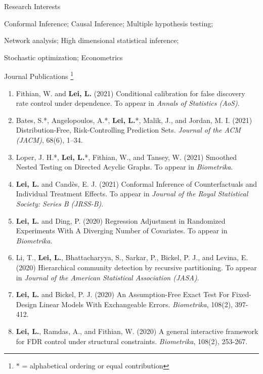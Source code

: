 \documentclass{article}
\begin{document}
\begin{large}
\noindent Research Interests
\end{large}

\vspace{3mm}
Conformal Inference; Causal Inference; Multiple hypothesis testing;

Network analysis; High dimensional statistical inference; 

Stochastic optimization; Econometrics

\vspace{3mm}

\clearpage
\begin{large}
\noindent Journal Publications \footnote{$\ast$ = alphabetical ordering or equal contribution}
\end{large}

\begin{enumerate}
\item Fithian, W. and \textbf{Lei, L.} (2021) Conditional calibration for false discovery rate control under dependence. To appear in \emph{Annals of Statistics (AoS)}.
\item Bates, S.*, Angelopoulos, A.*, \textbf{Lei, L.}*, Malik, J., and Jordan, M. I. (2021) Distribution-Free, Risk-Controlling Prediction Sets. \emph{Journal of the ACM (JACM)}, 68(6), 1–34.
\item Loper, J. H.*, \textbf{Lei, L.}*, Fithian, W., and Tansey, W. (2021) Smoothed Nested Testing on Directed Acyclic Graphs. To appear in \emph{Biometrika}.
\item \textbf{Lei, L.} and Cand\`{e}s, E. J. (2021) Conformal Inference of Counterfactuals and Individual Treatment Effects. To appear in \emph{Journal of the Royal Statistical Society: Series B (JRSS-B)}.
\item \textbf{Lei, L.} and Ding, P. (2020) Regression Adjustment in Randomized Experiments With A Diverging Number of Covariates. To appear in \emph{Biometrika}.
\item Li, T., \textbf{Lei, L.}, Bhattacharyya, S., Sarkar, P., Bickel, P. J., and Levina, E. (2020) Hierarchical community detection by recursive partitioning. To appear in \emph{Journal of the American Statistical Association (JASA)}.
\item \textbf{Lei, L.} and Bickel, P. J. (2020) An Assumption-Free Exact Test For Fixed-Design Linear Models With Exchangeable Errors. \emph{Biometrika}, 108(2), 397-412.
\item \textbf{Lei, L.}, Ramdas, A., and Fithian, W. (2020) A general interactive framework for FDR control under structural constraints. \emph{Biometrika}, 108(2), 253-267.

\end{enumerate}
\end{document}
